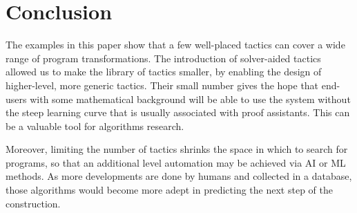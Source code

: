 \section{Conclusion}
\label{conc}

The examples in this paper show that a few well-placed tactics can cover a wide range
of program transformations. The introduction of solver-aided tactics allowed us to make
the library of tactics smaller, by enabling the design of higher-level, more generic
tactics. Their small number gives the hope that end-users with some mathematical background
will be able to use the system without the steep learning curve that is usually associated
with proof assistants. This can be a valuable tool for algorithms research.

Moreover, limiting the number of tactics shrinks the space in which to search for programs,
so that an additional level automation may be achieved via AI or ML methods. As more
developments are done by humans and collected in a database, those algorithms would become
more adept in predicting the next step of the construction.
